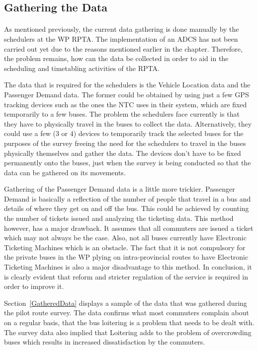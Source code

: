 \documentclass[12pt, oneside]{report}
\begin{document}
\subsection{Gathering the Data} 

\paragraph{ } As mentioned previously, the current data gathering is done manually by the schedulers at the WP RPTA. The implementation of an ADCS has not been carried out yet due to the reasons mentioned earlier in the chapter. Therefore, the problem remains, how can the data be collected in order to aid in the scheduling and timetabling activities of the RPTA.

The data that is required for the schedulers is the Vehicle Location data and the Passenger Demand data. The former could be obtained by using just a few GPS tracking devices such as the ones the NTC uses in their system, which are fixed temporarily to a few buses. The problem the schedulers face currently is that they have to physically travel in the buses to collect the data. Alternatively, they could use a few (3 or 4) devices to temporarily track the selected buses for the purposes of the survey freeing the need for the schedulers to travel in the buses physically themselves and gather the data. The devices don't have to be fixed permanently onto the buses, just when the survey is being conducted so that the data can be gathered on its movements.

Gathering of the Passenger Demand data is a little more trickier. Passenger Demand is basically a reflection of the number of people that travel in a bus and details of where they get on and off the bus. This could be achieved by counting the number of tickets issued and analyzing the ticketing data. This method however, has a major drawback. It assumes that all commuters are issued a ticket which may not always be the case. Also, not all buses currently have Electronic Ticketing Machines which is an obstacle. The fact that it is not compulsory for the private buses in the WP plying on intra-provincial routes to have Electronic Ticketing Machines is also a major disadvantage to this method. In conclusion, it is clearly evident that reform and stricter regulation of the service is required in order to improve it.

Section~\ref{GatheredData} displays a sample of the data that was gathered during the pilot route survey. The data confirms what most commuters complain about on a regular basis, that the bus loitering is a problem that needs to be dealt with. The survey data also implied that Loitering adds to the problem of overcrowding buses which results in increased dissatisfaction by the commuters.
\end{document}
